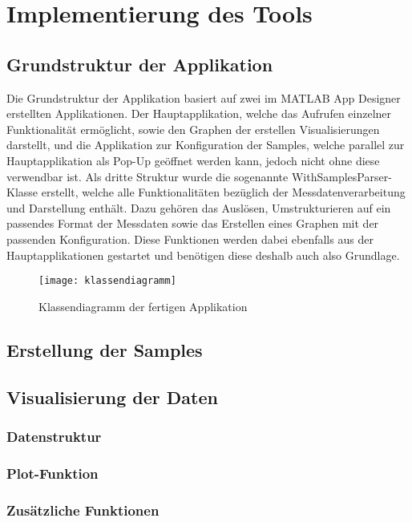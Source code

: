 
\chapter{Implementierung des Tools}

\section{Grundstruktur der Applikation}

Die Grundstruktur der Applikation basiert auf zwei im MATLAB App Designer erstellten Applikationen. Der Hauptapplikation, welche das Aufrufen einzelner Funktionalität ermöglicht, sowie den Graphen der erstellen Visualisierungen darstellt, und die Applikation zur Konfiguration der Samples, welche parallel zur Hauptapplikation als Pop-Up geöffnet werden kann, jedoch nicht ohne diese verwendbar ist. Als dritte Struktur wurde die sogenannte WithSamplesParser-Klasse erstellt, welche alle Funktionalitäten bezüglich der Messdatenverarbeitung und Darstellung enthält. Dazu gehören das Auslösen, Umstrukturieren auf ein passendes Format der Messdaten sowie das Erstellen eines Graphen mit der passenden Konfiguration. Diese Funktionen werden dabei ebenfalls aus der Hauptapplikationen gestartet und benötigen diese deshalb auch also Grundlage.

\begin{figure}[!htbp]
	\centering
	\texttt{[image: klassendiagramm]}
	\caption{Klassendiagramm der fertigen Applikation}
	\label{fig:klassendiagramm}
\end{figure}

\section{Erstellung der Samples}

\section{Visualisierung der Daten}

\subsection{Datenstruktur}

\subsection{Plot-Funktion}

\subsection{Zusätzliche Funktionen}